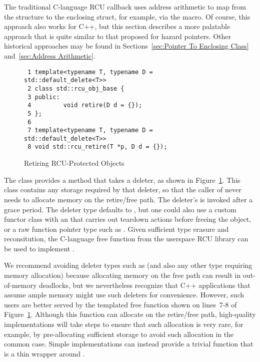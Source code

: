 \documentclass[letterpaper,10pt]{article}
\begin{document}
The traditional C-language RCU callback uses address arithmetic
to map from the  structure to the enclosing struct,
for example, via the  macro.
Of course, this approach also works for C++, but this section describes
a more palatable approach that is quite similar to that proposed for
hazard pointers.
Other historical approaches may be found in
Sections~\ref{sec:Pointer To Enclosing Class}
and~\ref{sec:Address Arithmetic}.

\begin{figure}[tbp]
{ \scriptsize
\begin{verbatim}
 1 template<typename T, typename D = std::default_delete<T>>
 2 class std::rcu_obj_base {
 3 public:
 4         void retire(D d = {});
 5 };
 6
 7 template<typename T, typename D = std::default_delete<T>>
 8 void std::rcu_retire(T *p, D d = {});
\end{verbatim}
}
\caption{Retiring RCU-Protected Objects}
\label{fig:Retiring RCU-Protected Objects}
\end{figure}

The  class provides a  method that
takes a deleter,
as shown in
Figure~\ref{fig:Retiring RCU-Protected Objects}.
This class contains any storage required by that deleter, so that
the caller of
 never needs to allocate
memory on the retire/free path.
The deleter's  is invoked after a grace period.
The deleter type defaults to ,
but one could also use a
custom functor class with an  that carries out teardown actions
before freeing the object, or a raw function pointer type such as
.
Given sufficient type erasure and reconsitution, the 
C-language free function from the userspace RCU library can be used to
implement .

We recommend avoiding deleter types such as 
(and also any other type requiring memory allocation) because
allocating memory on the free path can result in out-of-memory deadlocks,
but we nevertheless recognize that C++ applications that assume ample
memory might use such deleters for convenience.
However, such users are better served by the 
templated free function shown on lines~7-8 of
Figure~\ref{fig:Retiring RCU-Protected Objects}.
Although this function can allocate on the retire/free path, high-quality
implementations will take steps to ensure that such allocation is very
rare, for example, by pre-allocating sufficient storage to avoid
such allocation in the common case.
Simple implementations can instead provide a trivial 
function that is a thin wrapper around .
\end{document}
